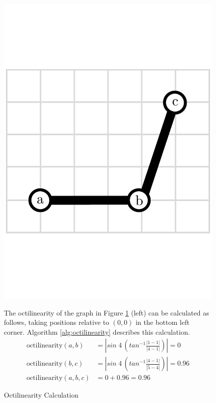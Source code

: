\begin{figure}[h]
\centering
\begin{minipage}{.4\textwidth}
  \includegraphics[width=.9\linewidth]{img/implementation/octilinearity.pdf}\caption{Octilinearity Calculation\label{fig:octilinearity}}
  \end{minipage}\hspace{0.5cm}\begin{minipage}{.55\textwidth}

The octilinearity of the graph in Figure \ref{fig:octilinearity} (left) can be calculated as follows, taking positions relative to $(0, 0)$ in the bottom left corner. Algorithm \ref{alg:octilinearity} describes this calculation.
$$\begin{aligned}
\text{octilinearity}(a, b) &= |sin\;4\,(tan^{-1}\frac{|1 - 1|}{|4 - 1|})| = 0 \\
\text{octilinearity}(b, c) &= |sin\;4\,(tan^{-1}\frac{|4 - 1|}{|5 - 4|})| = 0.96 \\[0.1cm]
\text{octilinearity}(a, b, c) &= 0 + 0.96 = 0.96
\end{aligned}$$
\end{minipage}
\end{figure}

